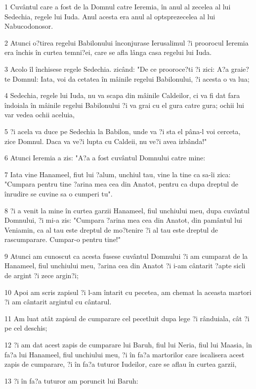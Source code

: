 \par 1 Cuvântul care a fost de la Domnul catre Ieremia, în anul al zecelea al lui Sedechia, regele lui Iuda. Anul acesta era anul al optsprezecelea al lui Nabucodonosor.
\par 2 Atunci o?tirea regelui Babilonului înconjurase Ierusalimul ?i proorocul Ieremia era închis în curtea temni?ei, care se afla lânga casa regelui lui Iuda.
\par 3 Acolo îl închisese regele Sedechia. zicând: "De ce prooroce?ti ?i zici: A?a graie?te Domnul: Iata, voi da cetatea în mâinile regelui Babilonului, ?i acesta o va lua;
\par 4 Sedechia, regele lui Iuda, nu va scapa din mâinile Caldeilor, ci va fi dat fara îndoiala în mâinile regelui Babilonului ?i va grai cu el gura catre gura; ochii lui var vedea ochii aceluia,
\par 5 ?i acela va duce pe Sedechia la Babilon, unde va ?i sta el pâna-l voi cerceta, zice Domnul. Daca va ve?i lupta cu Caldeii, nu ve?i avea izbânda!"
\par 6 Atunci Ieremia a zis: "A?a a fost cuvântul Domnului catre mine:
\par 7 Iata vine Hanameel, fiut lui ?alum, unchiul tau, vine la tine ca sa-îi zica: "Cumpara pentru tine ?arina mea cea din Anatot, pentru ca dupa dreptul de înrudire se cuvine sa o cumperi tu".
\par 8 ?i a venit la mine în curtea garzii Hanameel, fiul unchiului meu, dupa cuvântul Domnului, ?i mi-a zis: "Cumpara ?arina mea cea din Anatot, din pamântul lui Veniamin, ca al tau este dreptul de mo?tenire ?i al tau este dreptul de rascumparare. Cumpar-o pentru tine!"
\par 9 Atunci am cunoscut ca acesta fusese cuvântul Domnului ?i am cumparat de la Hanameel, fiul unchiului meu, ?arina cea din Anatot ?i i-am cântarit ?apte sicli de argint ?i zece argin?i;
\par 10 Apoi am scris zapisul ?i l-am întarit cu pecetea, am chemat la aceasta martori ?i am cântarit argintul cu cântarul.
\par 11 Am luat atât zapisul de cumparare cel pecetluit dupa lege ?i rânduiala, cât ?i pe cel deschis;
\par 12 ?i am dat acest zapis de cumparare lui Baruh, fiul lui Neria, fiul lui Maasia, în fa?a lui Hanameel, fiul unchiului meu, ?i în fa?a martorilor care iscalisera acest zapis de cumparare, ?i în fa?a tuturor Iudeilor, care se aflau în curtea garzii,
\par 13 ?i în fa?a tuturor am poruncit lui Baruh:
